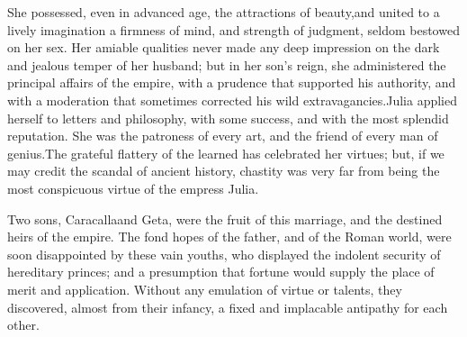 She possessed, even in advanced age, the attractions of beauty,\footnotemark[5]
and united to a lively imagination a firmness of mind, and
strength of judgment, seldom bestowed on her sex. Her amiable
qualities never made any deep impression on the dark and jealous
temper of her husband; but in her son’s reign, she administered
the principal affairs of the empire, with a prudence that
supported his authority, and with a moderation that sometimes
corrected his wild extravagancies.\footnotemark[6] Julia applied herself to
letters and philosophy, with some success, and with the most
splendid reputation. She was the patroness of every art, and the
friend of every man of genius.\footnotemark[7] The grateful flattery of the
learned has celebrated her virtues; but, if we may credit the
scandal of ancient history, chastity was very far from being the
most conspicuous virtue of the empress Julia.\footnotemark[8]







Two sons, Caracalla\footnotemark[9] and Geta, were the fruit of this marriage,
and the destined heirs of the empire. The fond hopes of the
father, and of the Roman world, were soon disappointed by these
vain youths, who displayed the indolent security of hereditary
princes; and a presumption that fortune would supply the place of
merit and application. Without any emulation of virtue or
talents, they discovered, almost from their infancy, a fixed and
implacable antipathy for each other.


